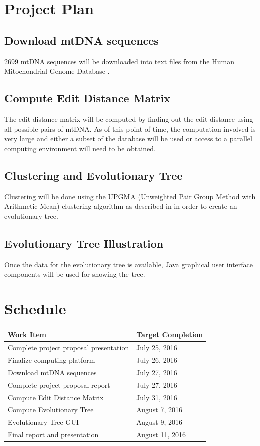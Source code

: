 \documentclass[conference]{IEEEtran}
\begin{document}
\section{Project Plan}

\subsection{Download mtDNA sequences}
2699 mtDNA sequences will be downloaded into text files from the Human Mitochondrial Genome Database \cite{mtDnaDatabase}.

\subsection{Compute Edit Distance Matrix}

The edit distance matrix will be computed by finding out the edit distance using all possible pairs of mtDNA. As of this point of time, the computation involved is very large and either a subset of the database will be used or access to a parallel computing environment will need to be obtained.

\subsection{Clustering and Evolutionary Tree}
Clustering will be done using the UPGMA (Unweighted Pair Group Method with Arithmetic Mean) clustering algorithm as described in \cite{TextBook1} in order to create an evolutionary tree.

\subsection{Evolutionary Tree Illustration}
Once the data for the evolutionary tree is available, Java graphical user interface components will be used for showing the tree.

\section{Schedule}

\begin{tabular}{ | l | l |}
  \hline			
  Work Item & Target Completion  \\
  \hline			
  Complete project proposal presentation & July 25, 2016  \\
  \hline			
  Finalize computing platform & July 26, 2016  \\
  \hline			
  Download mtDNA sequences & July 27, 2016  \\
  \hline			
  Complete project proposal report & July 27, 2016  \\
  \hline			
  Compute Edit Distance Matrix & July 31, 2016  \\
  \hline			
  Compute Evolutionary Tree & August 7, 2016 \\
  \hline			
  Evolutionary Tree GUI & August 9, 2016 \\
  \hline			
  Final report and presentation & August 11, 2016 \\
  \hline  
\end{tabular}
\end{document}
